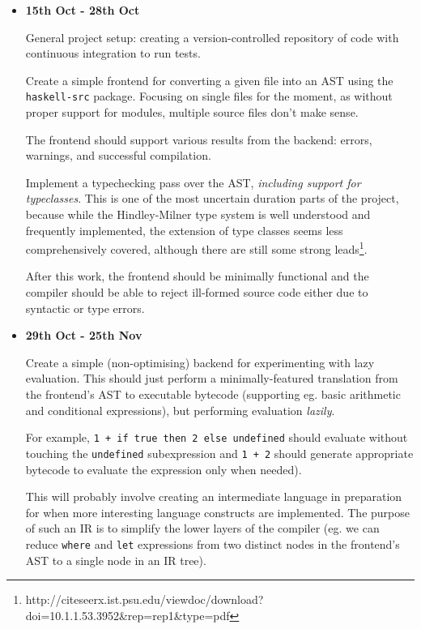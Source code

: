 \documentclass[12pt]{article}
\begin{document}
\begin{itemize}
\item
{
    \textbf{15th Oct - 28th Oct}

    General project setup: creating a version-controlled repository of code with continuous integration to run tests.

    Create a simple frontend for converting a given file into an AST using the \texttt{haskell-src} package.
    Focusing on single files for the moment, as without proper support for modules, multiple source files don't make
    sense.

    The frontend should support various results from the backend: errors, warnings, and successful compilation.

    Implement a typechecking pass over the AST, \textit{including support for typeclasses}. This is one of the most
    uncertain duration parts of the project, because while the Hindley-Milner type system is well understood and
    frequently implemented, the extension of type classes seems less comprehensively covered, although there are still
    some strong leads\footnote{http://citeseerx.ist.psu.edu/viewdoc/download?doi=10.1.1.53.3952\&rep=rep1\&type=pdf}.

    After this work, the frontend should be minimally functional and the compiler should be able to reject ill-formed
    source code either due to syntactic or type errors.
}
\item
{
    \textbf{29th Oct - 25th Nov}

    Create a simple (non-optimising) backend for experimenting with lazy evaluation. This should just perform a
    minimally-featured translation from the frontend's AST to executable bytecode (supporting eg. basic arithmetic and
    conditional expressions), but performing evaluation \textit{lazily}.

    For example, \texttt{1 + if true then 2 else undefined} should evaluate without touching the
    \texttt{undefined} subexpression and \texttt{1 + 2} should generate appropriate bytecode
    to evaluate the expression only when needed).
    
    This will probably involve creating an intermediate language in preparation for when more interesting language
    constructs are implemented. The purpose of such an IR is to simplify the lower layers of the compiler (eg. we can
    reduce \texttt{where} and \texttt{let} expressions from two distinct nodes in the
    frontend's AST to a single node in an IR tree).

}
\end{itemize}
\end{document}
